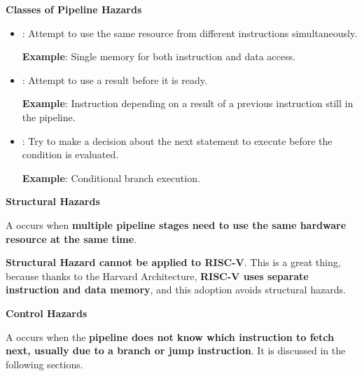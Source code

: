 \highspace
\begin{flushleft}
    \textcolor{Green3}{ \textbf{Classes of Pipeline Hazards}}
\end{flushleft}
\begin{itemize}
    \item {}: Attempt to use the same resource from different instructions simultaneously.
    
    \textcolor{Green3}{ \textbf{Example}}: Single memory for both instruction and data access.


    \item {}: Attempt to use a result before it is ready.

    \textcolor{Green3}{ \textbf{Example}}: Instruction depending on a result of a previous instruction still in the pipeline.
    
    
    \item {}: Try to make a decision about the next statement to execute before the condition is evaluated.
    
    \textcolor{Green3}{ \textbf{Example}}: Conditional branch execution.
\end{itemize}

\newpage

\begin{flushleft}
    \textcolor{Green3}{ \textbf{Structural Hazards}}
\end{flushleft}
A  occurs when \textbf{multiple pipeline stages need to use the same hardware resource at the same time}.

\highspace
\textcolor{Green3}{ \textbf{Structural Hazard cannot be applied to RISC-V}}. This is a great thing, because thanks to the Harvard Architecture, \textbf{RISC-V uses separate instruction and data memory}, and this adoption avoids structural hazards.


\highspace
\begin{flushleft}
    \textcolor{Red2}{ \textbf{Control Hazards}}
\end{flushleft}
A  occurs when the \textbf{pipeline does not know which instruction to fetch next, usually due to a branch or jump instruction}. It is discussed in the following sections.


